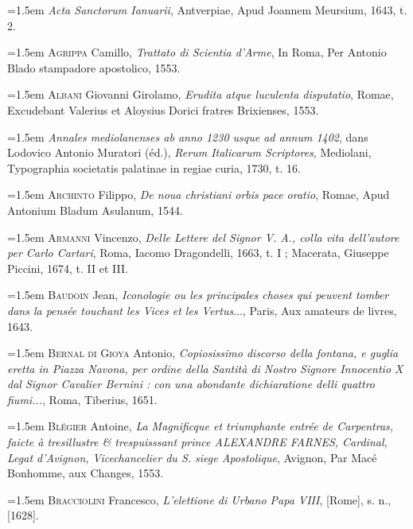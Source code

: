 \documentclass[12pt,twoside,openany]{book}
\newenvironment{PurhBibliography}
  {%
    \par
    \setlength{\parindent}{0pt}%
    \setlength{\leftskip}{0pt}%
  }
  {%
    \par
  }
\begin{document}
\begin{PurhBibliography}
\noindent\hangindent=1.5em \textit{Acta Sanctorum Ianuarii}, Antverpiae, Apud Joannem Meursium, 1643, t. 2.\par
\noindent\hangindent=1.5em \textsc{Agrippa} Camillo, \textit{Trattato di Scientia d’Arme}, In Roma, Per Antonio Blado stampadore apostolico, 1553.\par
\noindent\hangindent=1.5em \textsc{Albani} Giovanni Girolamo, \textit{Erudita atque luculenta disputatio}, Romae, Excudebant Valerius et Aloysius Dorici fratres Brixienses, 1553.\par
\noindent\hangindent=1.5em \textit{Annales mediolanenses ab anno 1230 usque ad annum 1402}, dans Lodovico Antonio Muratori (éd.), \textit{Rerum Italicarum Scriptores}, Mediolani, Typographia societatis palatinae in regiae curia, 1730, t. 16.\par
\noindent\hangindent=1.5em \textsc{Archinto} Filippo, \textit{De noua christiani orbis pace oratio}, Romae, Apud Antonium Bladum Asulanum, 1544.\par
\noindent\hangindent=1.5em \textsc{Armanni} Vincenzo, \textit{Delle Lettere del Signor V. A., colla vita dell’autore per Carlo Cartari}, Roma, Iacomo Dragondelli, 1663, t. I ; Macerata, Giuseppe Piccini, 1674, t. \textsc{II} et \textsc{III}.\par
\noindent\hangindent=1.5em \textsc{Baudoin} Jean, \textit{Iconologie ou les principales choses qui peuvent tomber dans la pensée touchant les Vices et les Vertus}..., Paris, Aux amateurs de livres, 1643.\par
\noindent\hangindent=1.5em \textsc{Bernal di Gioya} Antonio,\textit{ Copiosissimo discorso della fontana, e guglia eretta in Piazza Navona, per ordine della Santità di Nostro Signore Innocentio X dal Signor Cavalier Bernini : con una abondante dichiaratione delli quattro fiumi...}, Roma, Tiberius, 1651.\par
\noindent\hangindent=1.5em \textsc{Blégier} Antoine, \textit{La Magnificque et triumphante entrée de Carpentras, faicte à tresillustre \& trespuisssant prince ALEXANDRE FARNES, Cardinal, Legat d’Avignon, Vicechancelier du S. siege Apostolique}, Avignon, Par Macé Bonhomme, aux Changes, 1553.\par
\noindent\hangindent=1.5em \textsc{Bracciolini} Francesco, \textit{L’elettione di Urbano Papa VIII}, [Rome], s. n., [1628].\par

\end{PurhBibliography}
\end{document}
